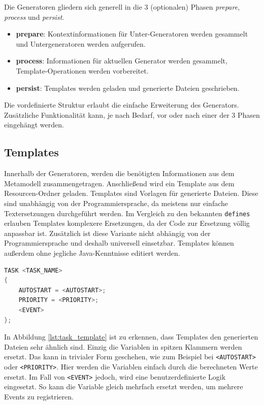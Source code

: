 Die Generatoren gliedern sich generell in die 3 (optionalen) Phasen \textit{prepare}, \textit{process} und \textit{persist}.
\begin{itemize}
\item \textbf{prepare}: Kontextinformationen für Unter-Generatoren werden gesammelt und Untergeneratoren werden aufgerufen.
\item \textbf{process}: Informationen für aktuellen Generator werden gesammelt, Template-Operationen werden vorbereitet.
\item \textbf{persist}: Templates werden geladen und generierte Dateien geschrieben.
\end{itemize}

Die vordefinierte Struktur erlaubt die einfache Erweiterung des Generators. Zusätzliche Funktionalität kann, je nach Bedarf, vor oder nach einer der 3 Phasen eingehängt werden.

\subsection{Templates}
Innerhalb der Generatoren, werden die benötigten Informationen aus dem Metamodell zusammengetragen. Anschließend wird ein Template aus dem Resourcen-Ordner geladen. Templates sind Vorlagen für generierte Dateien. Diese sind unabhängig von der Programmiersprache, da meistens nur einfache Textersetzungen durchgeführt werden. Im Vergleich zu den bekannten \texttt{defines} erlauben Templates komplexere Ersetzungen, da der Code zur Ersetzung völlig anpassbar ist. Zusätzlich ist diese Variante nicht abhängig von der Programmiersprache und deshalb universell einsetzbar.
Templates können außerdem ohne jegliche Java-Kenntnisse editiert werden.

\begin{lstlisting}[frame=single, language=c, label=lst:task_template, caption=Template für Task-Definition]  
TASK <TASK_NAME>
{
	AUTOSTART = <AUTOSTART>;
	PRIORITY = <PRIORITY>;	
	<EVENT>
};
\end{lstlisting}

In Abbildung \ref{lst:task_template} ist zu erkennen, dass Templates den generierten Dateien sehr ähnlich sind. Einzig die Variablen in spitzen Klammern werden ersetzt. Das kann in trivialer Form geschehen, wie zum Beispiel bei \texttt{<AUTOSTART>} oder \texttt{<PRIORITY>}. Hier werden die Variablen einfach durch die berechneten Werte ersetzt. Im Fall von \texttt{<EVENT>} jedoch, wird eine benutzerdefinierte Logik eingesetzt. So kann die Variable gleich mehrfach ersetzt werden, um mehrere Events zu registrieren.


